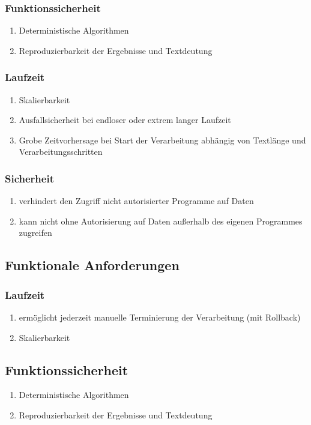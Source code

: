 \documentclass[12pt]{report}
\begin{document}
\subsubsection{Funktionssicherheit}
\begin{enumerate}
\item Deterministische Algorithmen
\item Reproduzierbarkeit der Ergebnisse und Textdeutung
\end{enumerate}
\subsubsection{Laufzeit}
\begin{enumerate}
\item Skalierbarkeit
\item Ausfallsicherheit bei endloser oder extrem langer Laufzeit
\item Grobe Zeitvorhersage bei Start der Verarbeitung abhängig von Textlänge und Verarbeitungsschritten
\end{enumerate}
\subsubsection{Sicherheit}
\begin{enumerate}
\item verhindert den Zugriff nicht autorisierter Programme auf Daten 
\item kann nicht ohne Autorisierung auf Daten außerhalb des eigenen Programmes zugreifen
\end{enumerate}
\subsection{Funktionale Anforderungen}
\subsubsection{Laufzeit}
\begin{enumerate}
\item ermöglicht jederzeit manuelle Terminierung der Verarbeitung (mit Rollback)
\item Skalierbarkeit
\end{enumerate}
\subsection{Funktionssicherheit}
\begin{enumerate}
\item Deterministische Algorithmen
\item Reproduzierbarkeit der Ergebnisse und Textdeutung
\end{enumerate}
\end{document}
